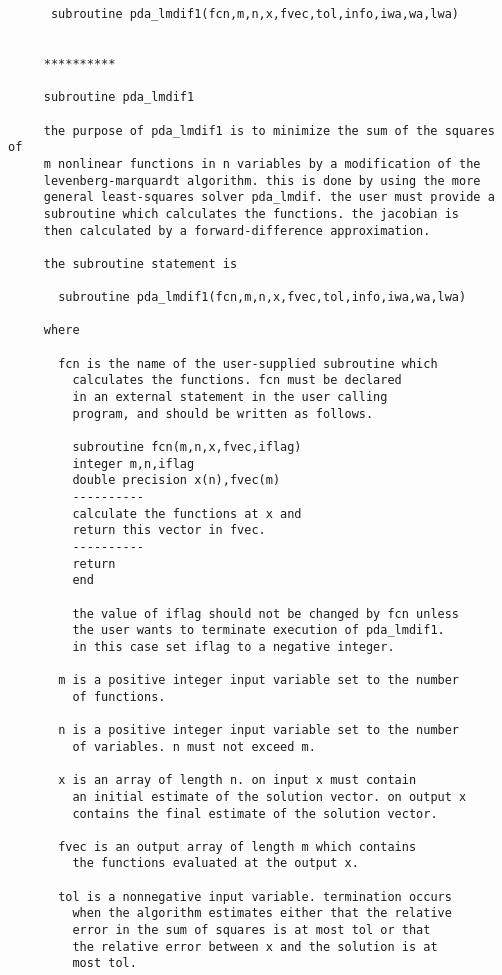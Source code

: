 \begin{verbatim}
      subroutine pda_lmdif1(fcn,m,n,x,fvec,tol,info,iwa,wa,lwa)


     **********

     subroutine pda_lmdif1

     the purpose of pda_lmdif1 is to minimize the sum of the squares of
     m nonlinear functions in n variables by a modification of the
     levenberg-marquardt algorithm. this is done by using the more
     general least-squares solver pda_lmdif. the user must provide a
     subroutine which calculates the functions. the jacobian is
     then calculated by a forward-difference approximation.

     the subroutine statement is

       subroutine pda_lmdif1(fcn,m,n,x,fvec,tol,info,iwa,wa,lwa)

     where

       fcn is the name of the user-supplied subroutine which
         calculates the functions. fcn must be declared
         in an external statement in the user calling
         program, and should be written as follows.

         subroutine fcn(m,n,x,fvec,iflag)
         integer m,n,iflag
         double precision x(n),fvec(m)
         ----------
         calculate the functions at x and
         return this vector in fvec.
         ----------
         return
         end

         the value of iflag should not be changed by fcn unless
         the user wants to terminate execution of pda_lmdif1.
         in this case set iflag to a negative integer.

       m is a positive integer input variable set to the number
         of functions.

       n is a positive integer input variable set to the number
         of variables. n must not exceed m.

       x is an array of length n. on input x must contain
         an initial estimate of the solution vector. on output x
         contains the final estimate of the solution vector.

       fvec is an output array of length m which contains
         the functions evaluated at the output x.

       tol is a nonnegative input variable. termination occurs
         when the algorithm estimates either that the relative
         error in the sum of squares is at most tol or that
         the relative error between x and the solution is at
         most tol.


\end{verbatim}
